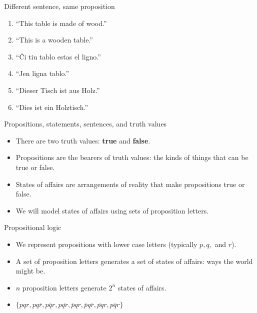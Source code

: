 \documentclass[
  ignorenonframetext,
]{beamer}
\providecommand{\tightlist}{%
  \setlength{\itemsep}{0pt}\setlength{\parskip}{0pt}}
\begin{document}
\begin{frame}{Different sentence, same proposition}
\protect\hypertarget{different-sentence-same-proposition}{}

\begin{enumerate}[<+->]
\tightlist
\item
  ``This table is made of wood.''
\item
  ``This is a wooden table.''
\item
  ``Ĉi tiu tablo estas el ligno.''
\item
  ``Jen ligna tablo.''
\item
  ``Dieser Tisch ist aus Holz.''
\item
  ``Dies ist ein Holztisch.''
\end{enumerate}

\end{frame}

\begin{frame}{Propositions, statements, sentences, and truth values}
\protect\hypertarget{propositions-statements-sentences-and-truth-values}{}

\begin{itemize}[<+->]
\item
  There are two truth values: \textbf{true} and \textbf{false}.
\item
  Propositions are the bearers of truth values: the kinds of things that
  can be true or false.
\item
  States of affairs are arrangements of reality that make propositions
  true or false.
\item
  We will model states of affairs using sets of proposition letters.
\end{itemize}

\end{frame}

\begin{frame}{Propositional logic}
\protect\hypertarget{propositional-logic}{}

\begin{itemize}[<+->]
\tightlist
\item
  We represent propositions with lower case letters (typically \(p, q,\)
  and \(r\)).
\item
  A set of proposition letters generates a set of states of affairs:
  ways the world might be.
\item
  \(n\) proposition letters generate \(2^n\) states of affairs.
\item
  \(\{pqr,pq\overline{r},p\overline{q}r,p\overline{qr},\overline{p}qr,\overline{p}q\overline{r},\overline{pq}r,\overline{pqr}\}\)
\end{itemize}

\end{frame}
\end{document}
